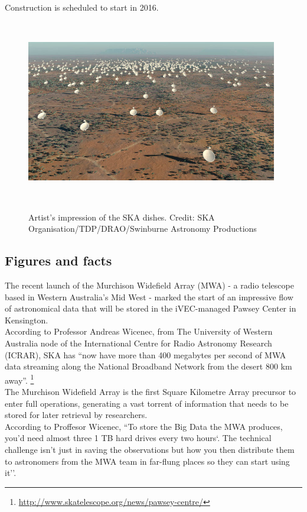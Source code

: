 Construction is scheduled to start in 2016.\\

\begin{figure}[H]
\centering
\includegraphics[width=11cm,height=8cm]{images/ska.jpg}\\
\caption{Artist's impression of the SKA dishes. Credit: SKA Organisation/TDP/DRAO/Swinburne Astronomy Productions}
\end{figure}

\subsection{Figures and facts}

The recent launch of the Murchison Widefield Array (MWA) - a radio telescope based in Western Australia's Mid West - marked the start of an impressive flow of astronomical data that will be stored in the iVEC-managed Pawsey Center in Kensington.\\

According to Professor Andreas Wicenec, from The University of Western Australia node of the International Centre for Radio Astronomy Research (ICRAR), SKA has ``now have more than 400 megabytes per second of MWA data streaming along the National Broadband Network from the desert 800 km away''. \footnote{\url{http://www.skatelescope.org/news/pawsey-centre/}} \\

The Murchison Widefield Array is the first Square Kilometre Array precursor to enter full operations, generating a vast torrent of information that needs to be stored for later retrieval by researchers.\\

According to Proffesor Wicenec, ``To store the Big Data the MWA produces, you’d need almost three 1 TB hard drives every two hours`. The technical challenge isn’t just in saving the observations but how you then distribute them to astronomers from the MWA team in far-flung places so they can start using it''.\\

